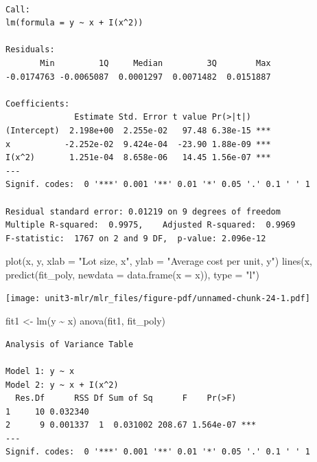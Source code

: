 \documentclass[
  letterpaper,
]{scrbook}
\newenvironment{Shaded}{\begin{snugshade}}{\end{snugshade}}
\newcommand{\AttributeTok}[1]{\textcolor[rgb]{0.40,0.45,0.13}{#1}}
\newcommand{\FunctionTok}[1]{\textcolor[rgb]{0.28,0.35,0.67}{#1}}
\newcommand{\NormalTok}[1]{\textcolor[rgb]{0.00,0.23,0.31}{#1}}
\newcommand{\OtherTok}[1]{\textcolor[rgb]{0.00,0.23,0.31}{#1}}
\newcommand{\SpecialCharTok}[1]{\textcolor[rgb]{0.37,0.37,0.37}{#1}}
\newcommand{\StringTok}[1]{\textcolor[rgb]{0.13,0.47,0.30}{#1}}
\begin{document}
\begin{verbatim}

Call:
lm(formula = y ~ x + I(x^2))

Residuals:
       Min         1Q     Median         3Q        Max 
-0.0174763 -0.0065087  0.0001297  0.0071482  0.0151887 

Coefficients:
              Estimate Std. Error t value Pr(>|t|)    
(Intercept)  2.198e+00  2.255e-02   97.48 6.38e-15 ***
x           -2.252e-02  9.424e-04  -23.90 1.88e-09 ***
I(x^2)       1.251e-04  8.658e-06   14.45 1.56e-07 ***
---
Signif. codes:  0 '***' 0.001 '**' 0.01 '*' 0.05 '.' 0.1 ' ' 1

Residual standard error: 0.01219 on 9 degrees of freedom
Multiple R-squared:  0.9975,    Adjusted R-squared:  0.9969 
F-statistic:  1767 on 2 and 9 DF,  p-value: 2.096e-12
\end{verbatim}

\begin{Shaded}
\begin{Highlighting}[]
\FunctionTok{plot}\NormalTok{(x, y, }\AttributeTok{xlab =} \StringTok{"Lot size, x"}\NormalTok{, }\AttributeTok{ylab =} \StringTok{"Average cost per unit, y"}\NormalTok{)}
\FunctionTok{lines}\NormalTok{(x, }\FunctionTok{predict}\NormalTok{(fit\_poly, }\AttributeTok{newdata =} \FunctionTok{data.frame}\NormalTok{(}\AttributeTok{x =}\NormalTok{ x)), }\AttributeTok{type =} \StringTok{"l"}\NormalTok{)}
\end{Highlighting}
\end{Shaded}

\texttt{[image: unit3-mlr/mlr\_files/figure-pdf/unnamed-chunk-24-1.pdf]}

\begin{Shaded}
\begin{Highlighting}[]
\NormalTok{fit1 }\OtherTok{\textless{}{-}} \FunctionTok{lm}\NormalTok{(y }\SpecialCharTok{\textasciitilde{}}\NormalTok{ x)}
\FunctionTok{anova}\NormalTok{(fit1, fit\_poly)}
\end{Highlighting}
\end{Shaded}

\begin{verbatim}
Analysis of Variance Table

Model 1: y ~ x
Model 2: y ~ x + I(x^2)
  Res.Df      RSS Df Sum of Sq      F    Pr(>F)    
1     10 0.032340                                  
2      9 0.001337  1  0.031002 208.67 1.564e-07 ***
---
Signif. codes:  0 '***' 0.001 '**' 0.01 '*' 0.05 '.' 0.1 ' ' 1
\end{verbatim}
\end{document}
